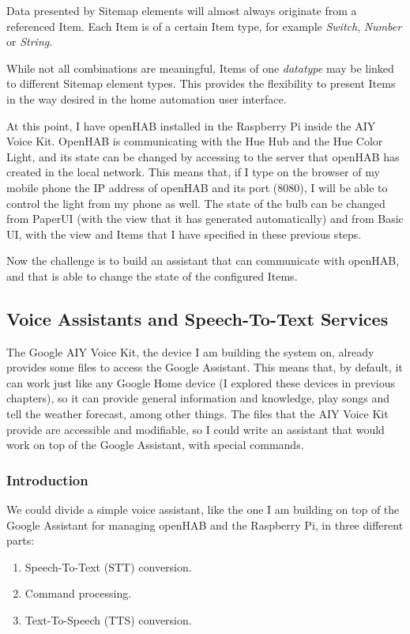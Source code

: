 Data presented by Sitemap elements will almost always originate from a referenced Item. Each Item is of a certain Item type, for
example \textit{Switch}, \textit{Number} or \textit{String}.

While not all combinations are meaningful, Items of one \textit{datatype} may be linked to different Sitemap element types. This
provides the flexibility to present Items in the way desired in the home automation user interface.

\bigskip
At this point, I have openHAB installed in the Raspberry Pi inside the AIY Voice Kit. OpenHAB is communicating with the Hue Hub and
the Hue Color Light, and its state can be changed by accessing to the server that openHAB has created in the local network. This means
that, if I type on the browser of my mobile phone the IP address of openHAB and its port (8080), I will be able to control the light from
my phone as well. The state of the bulb can be changed from PaperUI (with the view that it has generated automatically) and from
Basic UI, with the view and Items that I have specified in these previous steps.

Now the challenge is to build an assistant that can communicate with openHAB, and that is able to change the state of the configured
Items.

\subsection{Voice Assistants and Speech-To-Text Services}
The Google AIY Voice Kit, the device I am building the system on, already provides some files to access the Google Assistant. This
means that, by default, it can work just like any Google Home device (I explored these devices in previous chapters), so it can
provide general information and knowledge, play songs and tell the weather forecast, among other things. The files that the AIY Voice
Kit provide are accessible and modifiable, so I could write an assistant that would work on top of the Google Assistant, with special
commands.

\subsubsection{Introduction}
We could divide a simple voice assistant, like the one I am building on top of the Google Assistant for managing openHAB and the
Raspberry Pi, in three different parts:
\begin{enumerate}
    \item Speech-To-Text (STT) conversion.
    \item Command processing.
    \item Text-To-Speech (TTS) conversion.
\end{enumerate}

